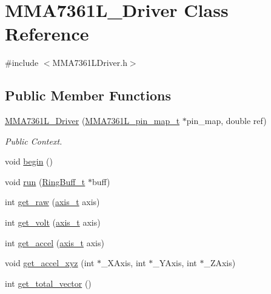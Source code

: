 \hypertarget{class_m_m_a7361_l___driver}{\section{\-M\-M\-A7361\-L\-\_\-\-Driver \-Class \-Reference}
\label{class_m_m_a7361_l___driver}
}


{\ttfamily \#include $<$\-M\-M\-A7361\-L\-Driver.\-h$>$}

\subsection*{\-Public \-Member \-Functions}
\begin{DoxyCompactItemize}
\item 
\hyperlink{class_m_m_a7361_l___driver_a3922dcb02cf001fba03106e608568222}{\-M\-M\-A7361\-L\-\_\-\-Driver} (\hyperlink{struct_m_m_a7361_l__pin__map__t}{\-M\-M\-A7361\-L\-\_\-pin\-\_\-map\-\_\-t} $\ast$pin\-\_\-map, double ref)
\begin{DoxyCompactList}\small\item\em \-Public \-Context. \end{DoxyCompactList}\item 
void \hyperlink{class_m_m_a7361_l___driver_a7fdae5f1848de9fc5e3a3b278263042f}{begin} ()
\item 
void \hyperlink{class_m_m_a7361_l___driver_a1c76ed75e125432a6424b2a182355e7f}{run} (\hyperlink{struct_ring_buff__t}{\-Ring\-Buff\-\_\-t} $\ast$buff)
\item 
int \hyperlink{class_m_m_a7361_l___driver_a12755e0b931fcd96341008268c63b516}{get\-\_\-raw} (\hyperlink{_utilities_8h_ae7747145441b0591a5c04f20f6f9189a}{axis\-\_\-t} axis)
\item 
int \hyperlink{class_m_m_a7361_l___driver_a13345944aee14491138a2266863b0d10}{get\-\_\-volt} (\hyperlink{_utilities_8h_ae7747145441b0591a5c04f20f6f9189a}{axis\-\_\-t} axis)
\item 
int \hyperlink{class_m_m_a7361_l___driver_a33d5fe3264a2ecee0bcc5d56328171cb}{get\-\_\-accel} (\hyperlink{_utilities_8h_ae7747145441b0591a5c04f20f6f9189a}{axis\-\_\-t} axis)
\item 
void \hyperlink{class_m_m_a7361_l___driver_a2bb01f088ddde959c0f3c208cd3b674e}{get\-\_\-accel\-\_\-xyz} (int $\ast$\-\_\-\-X\-Axis, int $\ast$\-\_\-\-Y\-Axis, int $\ast$\-\_\-\-Z\-Axis)
\item 
int \hyperlink{class_m_m_a7361_l___driver_a9f1486f4815a63d1428e9f0855794076}{get\-\_\-total\-\_\-vector} ()

\end{DoxyCompactItemize}
